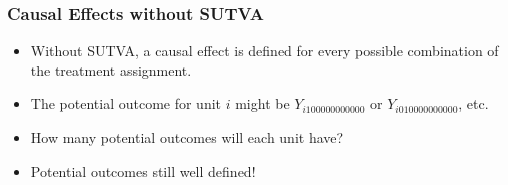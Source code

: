 \documentclass{beamer}
\begin{document}
	\begin{frame}[t]\frametitle{Causal Effects without SUTVA}
		\begin{itemize}
			\item Without SUTVA, a causal effect is defined for every possible combination of the treatment assignment.
			\item The potential outcome for unit $i$ might be $Y_{i100000000000}$ or $Y_{i010000000000}$, etc. 
			\item How many potential outcomes will each unit have? 
			\item Potential outcomes still well defined! 
		\end{itemize}
	\end{frame}
\end{document}
